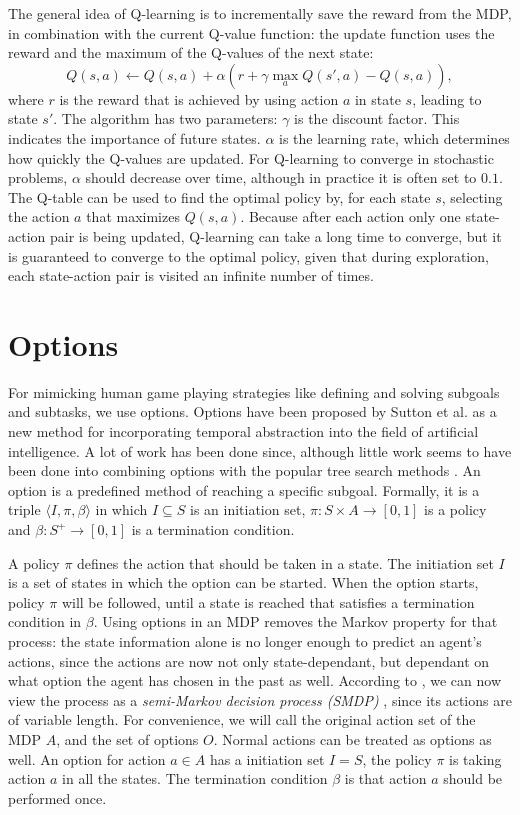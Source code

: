 The general idea of Q-learning is to incrementally save the reward from the MDP,
in combination with the current Q-value function: the update function uses the
reward and the maximum of the Q-values of the next state: 
\begin{equation}
	\label{eq:qlearning}
	Q(s, a) \gets Q(s, a) + \alpha \left(r + \gamma \max_a Q(s', a) - Q(s, a)\right),
\end{equation}
where $r$ is the reward that is achieved by using action $a$ in state $s$,
leading to state $s'$. The algorithm has two parameters: $\gamma$ is the
discount factor. This indicates the importance of future states. $\alpha$ is the
learning rate, which determines how quickly the Q-values are updated. For
Q-learning to converge in stochastic problems, $\alpha$ should decrease over
time, although in practice it is often set to $0.1$. The Q-table can be used to
find the optimal policy by, for each state $s$, selecting the action $a$ that
maximizes $Q(s, a)$. Because after each action only one state-action pair is
being updated, Q-learning can take a long time to converge, but it is guaranteed
to converge to the optimal policy, given that during exploration, each
state-action pair is visited an infinite number of times.

\section{Options}
\label{subsec:options}
For mimicking human game playing strategies like defining and solving subgoals
and subtasks, we use options. Options have been proposed by Sutton et al.
\cite{sutton1999between} as a new method for incorporating temporal abstraction
into the field of artificial intelligence. A lot of work has been done since,
although little work seems to have been done into combining options with the
popular tree search methods \cite{barto2003recent}.  An option is a predefined
method of reaching a specific subgoal. Formally, it is a triple $\langle I, \pi,
\beta\rangle$ in which $I \subseteq S$ is an initiation set, $\pi: S \times A
\rightarrow [0, 1]$ is a policy and $\beta: S^+ \rightarrow[0,1]$ is a
termination condition.

A policy $\pi$ defines the action that should be taken in a state. The
initiation set $I$ is a set of states in which the option can be started. When the
option starts, policy $\pi$ will be followed, until a state is reached that
satisfies a termination condition in $\beta$. Using options in an MDP removes
the Markov property for that process: the state information alone is no longer
enough to predict an agent's actions, since the actions are now not only
state-dependant, but dependant on what option the agent has chosen in the past
as well. According to \cite{sutton1999between}, we can now view the process as
a \emph{semi-Markov decision process (SMDP)} \cite{duff1995reinforcement},
since its actions are of variable length. For convenience, we will call the
original action set of the MDP $A$, and the set of options $O$.  Normal actions
can be treated as options as well.  An option for action $a \in A$ has a
initiation set $I = S$, the policy $\pi$ is taking action $a$ in all the
states.  The termination condition $\beta$ is that action $a$ should be
performed once.


